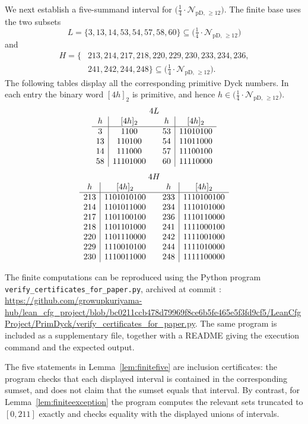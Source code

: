 \documentclass[12pt]{article}
\theoremstyle{plain}
\newcommand{\Pset}{\bigl(\tfrac14\cdot
  \mathcal N_{\mathrm{pD,\,\geq12}}\bigr)}
\begin{document}
We next establish a five-summand interval for $\Pset$.  The finite base
uses the two subsets
\[
 L=\{3,13,14,53,54,57,58,60\}\subseteq\Pset
\]
and
\[
\begin{split}
 H=\{&213,214,217,218,220,229,230,233,234,236,\\
     &241,242,244,248\}\subseteq\Pset.
\end{split}
\]
The following tables display all the corresponding primitive Dyck
numbers.  In each entry the binary word $[4h]_2$ is primitive, and hence
$h\in\Pset$.
\[
\begin{array}{c|c@{\qquad}c|c}
\multicolumn{4}{c}{4L}\\
h&[4h]_2&h&[4h]_2\\ \hline
3&1100&53&11010100\\
13&110100&54&11011000\\
14&111000&57&11100100\\
58&11101000&60&11110000
\end{array}
\]
\[
\begin{array}{c|c@{\qquad}c|c}
\multicolumn{4}{c}{4H}\\
h&[4h]_2&h&[4h]_2\\ \hline
213&1101010100&233&1110100100\\
214&1101011000&234&1110101000\\
217&1101100100&236&1110110000\\
218&1101101000&241&1111000100\\
220&1101110000&242&1111001000\\
229&1110010100&244&1111010000\\
230&1110011000&248&1111100000
\end{array}
\]

The finite computations can be reproduced using the Python program
\texttt{verify\_certificates\_for\_paper.py}, archived at commit
:
\url{https://github.com/growupkuriyama-hub/lean_cfg_project/blob/bc0211ccb478d79969f8ce6b5fe465e5f3fd9cf5/LeanCfgProject/PrimDyck/verify_certificates_for_paper.py}.
The same program is included as a supplementary file, together with a
README giving the execution command and the expected output.

The five statements in Lemma~\ref{lem:finitefive} are inclusion
certificates: the program checks that each displayed interval is
contained in the corresponding sumset, and does not claim that the
sumset equals that interval.  By contrast, for
Lemma~\ref{lem:finiteexception} the program computes the relevant sets
truncated to $[0,211]$ exactly and checks equality with the displayed
unions of intervals.
\end{document}
